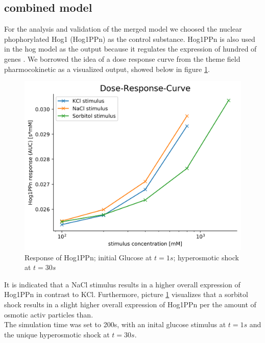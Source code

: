 \subsection{combined model}
For the analysis and validation of the merged model we choosed the nuclear phophorylated Hog1 (Hog1PPn) as the control substance. Hog1PPn is also used in the hog model as the output because it regulates the expression of hundred of genes \cite{Zi_2010}. We borrowed the idea of a dose response curve from the theme field pharmocokinetic as a visualized output, showed below in figure \ref{DrugResponseCurve}.  \\
\begin{figure}[h!]
	\begin{center}
		\begin{minipage}{0,8\textwidth}
			
			\includegraphics[width=\textwidth]{picture/Drug_response.png}
			\caption{Response of Hog1PPn; initial Glucose at $t=1s$; hyperosmotic shock at $t=30s$} 
			\label{DrugResponseCurve} 
		\end{minipage}
	\end{center}
\end{figure}
It is indicated that a NaCl stimulus results in a higher overall expression of Hog1PPn in contrast to KCl. Furthermore, picture \ref{DrugResponseCurve} visualizes that a sorbitol shock results in a slight higher overall expression of Hog1PPn per the amount of osmotic activ particles than.\\ The simulation time was set to 200s, with an inital glucose stimulus at $t=1s$ and the unique hyperosmotic shock at $t=30s$. \\\\
